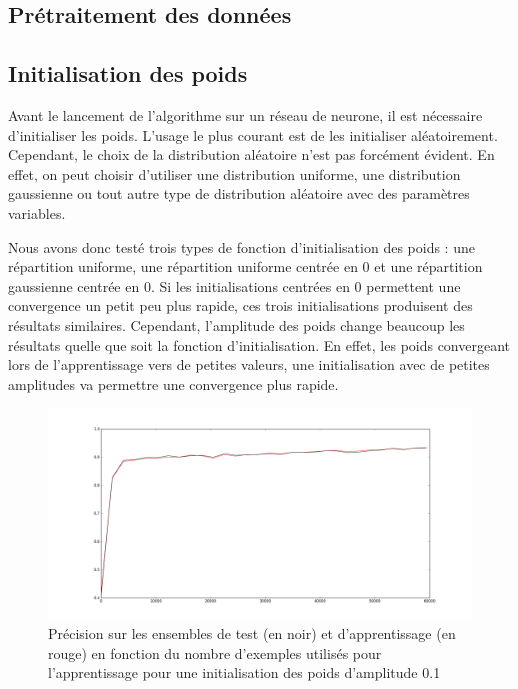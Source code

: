\documentclass{report}
\theoremstyle{plain}
\theoremstyle{definition}
\theoremstyle{remark}
\begin{document}
\subsection{Prétraitement des données}


\subsection{Initialisation des poids}
Avant le lancement de l'algorithme sur un réseau de neurone, il est nécessaire d'initialiser les poids.	L'usage le plus courant est de les initialiser aléatoirement. Cependant, le choix de la distribution aléatoire n'est pas forcément évident. En effet, on peut choisir d'utiliser une distribution uniforme, une distribution gaussienne ou tout autre type de distribution aléatoire avec des paramètres variables.

Nous avons donc testé trois types de fonction d'initialisation des poids : une répartition uniforme, une répartition uniforme centrée en 0  et une répartition gaussienne centrée en 0.
Si les initialisations centrées en 0 permettent une convergence un petit peu plus rapide, ces trois initialisations produisent des résultats similaires. Cependant, l'amplitude des poids change beaucoup les résultats quelle que soit la fonction d'initialisation. En effet, les poids convergeant lors de l'apprentissage vers de petites valeurs, une initialisation avec de petites amplitudes va permettre une convergence plus rapide.

\begin{figure}[!h]
\begin{center}
\includegraphics[scale=0.2]{images/initialisationpoids_amplitude01.png}
\caption{Précision sur les ensembles de test (en noir) et d'apprentissage (en rouge) en fonction du nombre d'exemples utilisés pour l'apprentissage pour une initialisation des poids d'amplitude 0.1 }
\label{initialisationpoids_amplitude0.1}
\end{center}
\end{figure}
\end{document}
